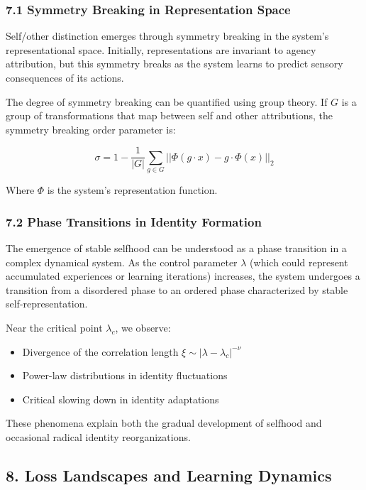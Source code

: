 \documentclass[
]{article}
\providecommand{\tightlist}{%
  \setlength{\itemsep}{0pt}\setlength{\parskip}{0pt}}
\begin{document}
\subsubsection{7.1 Symmetry Breaking in Representation
Space}\label{symmetry-breaking-in-representation-space}

Self/other distinction emerges through symmetry breaking in the system's
representational space. Initially, representations are invariant to
agency attribution, but this symmetry breaks as the system learns to
predict sensory consequences of its actions.

The degree of symmetry breaking can be quantified using group theory. If
\(G\) is a group of transformations that map between self and other
attributions, the symmetry breaking order parameter is:

\[\sigma = 1 - \frac{1}{|G|}\sum_{g \in G} ||\Phi(g \cdot x) - g \cdot \Phi(x)||_2\]

Where \(\Phi\) is the system's representation function.

\subsubsection{7.2 Phase Transitions in Identity
Formation}\label{phase-transitions-in-identity-formation}

The emergence of stable selfhood can be understood as a phase transition
in a complex dynamical system. As the control parameter \(\lambda\)
(which could represent accumulated experiences or learning iterations)
increases, the system undergoes a transition from a disordered phase to
an ordered phase characterized by stable self-representation.

Near the critical point \(\lambda_c\), we observe:

\begin{itemize}
\tightlist
\item
  Divergence of the correlation length
  \(\xi \sim |\lambda - \lambda_c|^{-\nu}\)
\item
  Power-law distributions in identity fluctuations
\item
  Critical slowing down in identity adaptations
\end{itemize}

These phenomena explain both the gradual development of selfhood and
occasional radical identity reorganizations.

\subsection{8. Loss Landscapes and Learning
Dynamics}\label{loss-landscapes-and-learning-dynamics}
\end{document}
